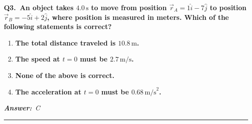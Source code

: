 \documentclass[11pt]{article}
\newcommand{\QuestionStyle}[1]{{\large\bfseries\boldmath #1}}
\newcommand{\AnswerStyle}[1]{{\large\bfseries\boldmath #1}}
\newcommand{\ReasonStyle}[1]{{\normalsize #1}}
\newif\ifshowreason
\newcommand{\Correct}[2]{%
  \item \AnswerStyle{\textcolor{AnsRed}{#1}}%
  \ifshowreason\\[-0.2em]
    \ReasonStyle{\textcolor{AnsRed}{#2}}%
  \fi
}
\newcommand{\Wrong}[2]{%
  \item \AnswerStyle{\textcolor{WrongBlue}{#1}}%
  \ifshowreason\\[-0.2em]
    \ReasonStyle{\textcolor{WrongBlue}{#2}}%
  \fi
}
\newcommand{\QBlock}[4]{%
  \Needspace{8\baselineskip}%
  \noindent
  \begin{minipage}{\linewidth}
    \QuestionStyle{#1.~#2}

    \vspace{0.25em}
    \begin{enumerate}
      #3
    \end{enumerate}

    \vspace{0.1em}
    \noindent\textcolor{AnsRed}{\textit{\textbf{Answer:}~#4}}

    \vspace{0.25em}
    \hrule height 0.4pt
  \end{minipage}
  \vspace{0.75em}
}
\begin{document}
\QBlock{Q3}{An object takes \(4.0\,\text{s}\) to move from position \(\vec r_A = 1\hat i - 7\hat j\) to position \(\vec r_B = -5\hat i + 2\hat j\), where position is measured in meters. Which of the following statements is correct?}{
\Wrong{The total distance traveled is \(10.8\,\text{m}\).}{\(10.8\,\text{m}\) is the magnitude of the displacement, found from \(|\Delta \vec r|=\sqrt{(-6)^2+9^2}=\sqrt{117}\approx 10.8\,\text{m}\). The actual distance traveled depends on the path taken, which is not given.}
\Wrong{The speed at \(t=0\) must be \(2.7\,\text{m/s}\).}{Dividing displacement magnitude by elapsed time gives information related to average motion, not the instantaneous speed at the start. Instantaneous speed at \(t=0\) cannot be determined from only initial and final positions plus total time.}
\Correct{None of the above is correct.}{The displacement is \(\Delta \vec r = (-5-1)\hat i + (2-(-7))\hat j = -6\hat i + 9\hat j\), with magnitude \(|\Delta \vec r|=\sqrt{117}\approx 10.8\,\text{m}\). However, that value is not necessarily the path length, and neither the initial speed nor the initial acceleration is uniquely determined from the information provided, so the other statements are not correct.}
\Wrong{The acceleration at \(t=0\) must be \(0.68\,\text{m/s}^2\).}{Acceleration requires more detailed information about how velocity changes with time. Initial and final positions together with elapsed time are insufficient to determine the acceleration at a particular instant.}
}{C}
\end{document}

